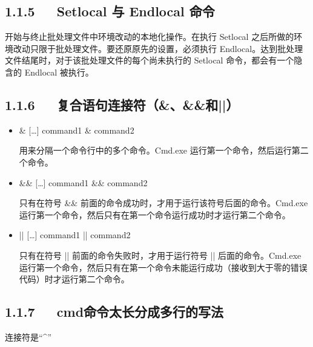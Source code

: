 \documentclass[letterpaper,12pt,english]{sphinxmanual}
\begin{document}
\subsection{1.1.5   Setlocal 与 Endlocal 命令}
\label{\detokenize{001software/002usage/bat:setlocal-endlocal}}
开始与终止批处理文件中环境改动的本地化操作。在执行 Setlocal 之后所做的环境改动只限于批处理文件。要还原原先的设置，必须执行 Endlocal。达到批处理文件结尾时，对于该批处理文件的每个尚未执行的 Setlocal 命令，都会有一个隐含的 Endlocal 被执行。


\subsection{1.1.6   复合语句连接符（\&、\&\&和||）}
\label{\detokenize{001software/002usage/bat:id2}}\begin{itemize}
\item {} 
\& {[}…{]} command1 \& command2

用来分隔一个命令行中的多个命令。Cmd.exe 运行第一个命令，然后运行第二个命令。

\item {} 
\&\& {[}…{]} command1 \&\& command2

只有在符号 \&\& 前面的命令成功时，才用于运行该符号后面的命令。Cmd.exe 运行第一个命令，然后只有在第一个命令运行成功时才运行第二个命令。

\item {} 
|| {[}…{]} command1 || command2

只有在符号 || 前面的命令失败时，才用于运行符号 || 后面的命令。Cmd.exe 运行第一个命令，然后只有在第一个命令未能运行成功（接收到大于零的错误代码）时才运行第二个命令。

\end{itemize}


\subsection{1.1.7   cmd命令太长分成多行的写法}
\label{\detokenize{001software/002usage/bat:cmd}}
连接符是“\textasciicircum{}”

\begin{sphinxVerbatim}[commandchars=\\\{\}]
  
\end{sphinxVerbatim}
\end{document}
